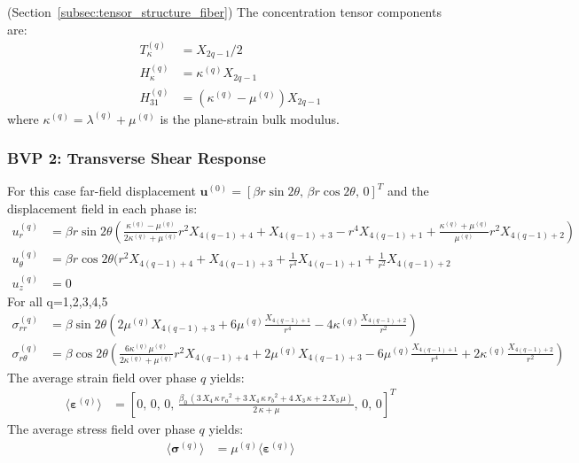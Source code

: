 \documentclass[oneside, 12pt, a4paper, bibliography=totoc]{book}
\newcommand{\bs}[1]{\bm{#1}}                       %
\begin{document}
(Section~\ref{subsec:tensor_structure_fiber})
The concentration tensor components are:
%
\begin{align}
    T_{\kappa}^{(q)} &= X_{2q-1}/2 \label{eq:Tkappa_fiber} \\[6pt]
    H_{\kappa}^{(q)} &= \kappa^{(q)} X_{2q-1} \label{eq:Hkappa_fiber} \\[6pt]
    H_{31}^{(q)} &= (\kappa^{(q)}-\mu^{(q)}) X_{2q-1} \label{eq:H31_fiber}
\end{align}
%
where $\kappa^{(q)} = \lambda^{(q)} + \mu^{(q)}$ is the plane-strain bulk modulus.

\subsubsection{BVP 2: Transverse Shear Response}

For this case far-field displacement $\bs{u}^{(0)} = [\beta r \sin 2\theta, \, \beta r \cos 2\theta, \, 0]^T$ and the displacement field in each phase is:
%
\begin{align}
    u_r^{(q)} &= \beta r \sin 2\theta (\frac{\kappa^{(q)} - \mu^{(q)}}{2\kappa^{(q)} + \mu^{(q)}} r^2 X_{4(q-1)+4} + X_{4(q-1)+3} - r^4 X_{4(q-1)+1} + \frac{\kappa^{(q)} + \mu^{(q)}}{\mu^{(q)}} r^2 X_{4(q-1)+2}\label{eq:Ur_transverse}) \\
    u_\theta^{(q)} &= \beta r \cos 2\theta(r^2 X_{4(q-1)+4} + X_{4(q-1)+3} + \frac{1}{r^4} X_{4(q-1)+1}+ \frac{1}{r^2} X_{4(q-1)+2} \\
    u_z^{(q)} &=0\label{eq:Utheta_transverse}
\end{align}
%
For all q=1,2,3,4,5
%
\begin{align}
    \sigma_{rr}^{(q)} &= \beta \sin 2\theta (2\mu^{(q)}X_{4(q-1)+3} + 6\mu^{(q)} \frac{X_{4(q-1)+1}}{r^4} - 4\kappa^{(q)} \frac{X_{4(q-1)+2}}{r^2})  \\
    \sigma_{r\theta}^{(q)} &= \beta \cos 2\theta(\frac{6\kappa^{(q)}\mu^{(q)}}{2\kappa^{(q)} + \mu^{(q)}} r^2 X_{4(q-1)+4} + 2\mu^{(q)} X_{4(q-1)+3} - 6\mu^{(q)} \frac{X_{4(q-1)+1}}{r^4} + 2\kappa^{(q)} \frac{X_{4(q-1)+2}}{r^2}) 
\end{align}
%
The average strain field over phase $q$ yields:
%
\begin{align}
\langle \bs{\varepsilon}^{(q)} \rangle
&=[0, \, 0, \, 0, \, \frac{\beta_0 \,{\left(3\,X_4 \,\kappa \,{r_a }^2 +3\,X_4 \,\kappa \,{r_b }^2 +4\,X_3 \,\kappa +2\,X_3 \,\mu \right)}}{2\,\kappa +\mu },\,0,\,0
]^T
\end{align}
The average stress field over phase $q$ yields:
\begin{align}
\langle \bs{\sigma}^{(q)} \rangle
&=
\mu^{(q)}\langle \bs{\varepsilon}^{(q)} \rangle
\end{align}
\end{document}
